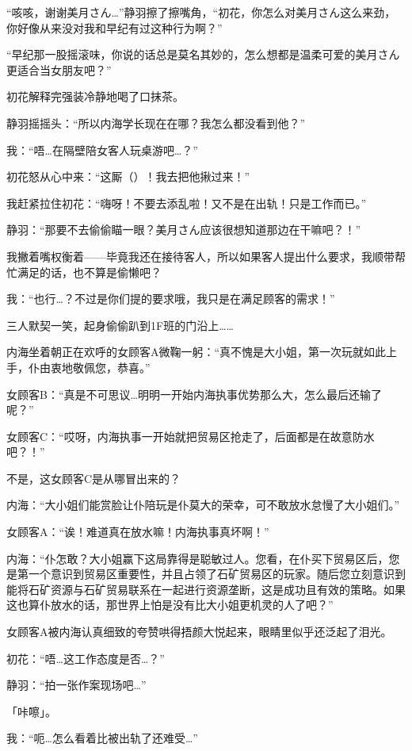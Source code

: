 “咳咳，谢谢美月さん…”静羽擦了擦嘴角，“初花，你怎么对美月さん这么来劲，你好像从来没对我和早纪有过这种行为啊？”

“早纪那一股摇滚味，你说的话总是莫名其妙的，怎么想都是温柔可爱的美月さん更适合当女朋友吧？”

初花解释完强装冷静地喝了口抹茶。

静羽摇摇头：“所以内海学长现在在哪？我怎么都没看到他？”

我：“唔…在隔壁陪女客人玩桌游吧…？”

初花怒从心中来：“这厮（）！我去把他揪过来！”

我赶紧拉住初花：“嗨呀！不要去添乱啦！又不是在出轨！只是工作而已。”

静羽：“那要不去偷偷瞄一眼？美月さん应该很想知道那边在干嘛吧？！”

我撇着嘴权衡着——毕竟我还在接待客人，所以如果客人提出什么要求，我顺带帮忙满足的话，也不算是偷懒吧？

我：“也行…？不过是你们提的要求哦，我只是在满足顾客的需求！”

三人默契一笑，起身偷偷趴到1F班的门沿上……




内海坐着朝正在欢呼的女顾客A微鞠一躬：“真不愧是大小姐，第一次玩就如此上手，仆由衷地敬佩您，恭喜。”

女顾客B：“真是不可思议…明明一开始内海执事优势那么大，怎么最后还输了呢？”

女顾客C：“哎呀，内海执事一开始就把贸易区抢走了，后面都是在故意防水吧？！”

不是，这女顾客C是从哪冒出来的？

内海：“大小姐们能赏脸让仆陪玩是仆莫大的荣幸，可不敢放水怠慢了大小姐们。”

女顾客A：“诶！难道真在放水嘛！内海执事真坏啊！”

内海：“仆怎敢？大小姐赢下这局靠得是聪敏过人。您看，在仆买下贸易区后，您是第一个意识到贸易区重要性，并且占领了石矿贸易区的玩家。随后您立刻意识到能将石矿资源与石矿贸易联系在一起进行资源垄断，这是成功且有效的策略。如果这也算仆放水的话，那世界上怕是没有比大小姐更机灵的人了吧？”

女顾客A被内海认真细致的夸赞哄得捂颜大悦起来，眼睛里似乎还泛起了泪光。

初花：“唔…这工作态度是否…？”

静羽：“拍一张作案现场吧…”

「咔嚓」。

我：“呃…怎么看着比被出轨了还难受…”

